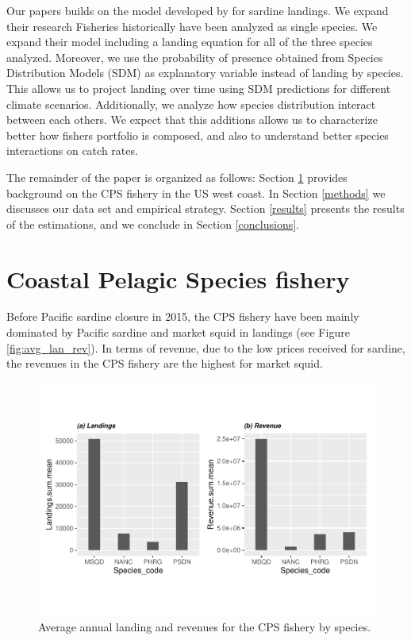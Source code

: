Our papers builds on the model developed by \citet{smith2021potential}
for sardine landings. We expand their research Fisheries historically
have been analyzed as single species. We expand their model including a
landing equation for all of the three species analyzed. Moreover, we use
the probability of presence obtained from Species Distribution Models
(SDM) as explanatory variable instead of landing by species. This allows
us to project landing over time using SDM predictions for different
climate scenarios. Additionally, we analyze how species distribution
interact between each others. We expect that this additions allows us to
characterize better how fishers portfolio is composed, and also to
understand better species interactions on catch rates.

The remainder of the paper is organized as follows: Section
\ref{coastal-pelagic-species-fishery} provides background on the CPS
fishery in the US west coast. In Section \ref{methods} we discusses our
data set and empirical strategy. Section \ref{results} presents the
results of the estimations, and we conclude in Section
\ref{conclusions}.

\hypertarget{coastal-pelagic-species-fishery}{%
\section{Coastal Pelagic Species
fishery}\label{coastal-pelagic-species-fishery}}

Before Pacific sardine closure in 2015, the CPS fishery have been mainly
dominated by Pacific sardine and market squid in landings (see Figure
\ref{fig:avg_lan_rev}). In terms of revenue, due to the low prices
received for sardine, the revenues in the CPS fishery are the highest
for market squid.

\begin{Schunk}
\begin{figure}
\includegraphics{econ_landings_paper_files/figure-latex/avg_landings-1} \caption{Average annual landing and revenues for the CPS fishery by species.\label{fig:avg_lan_rev}}\label{fig:avg_landings}
\end{figure}
\end{Schunk}

